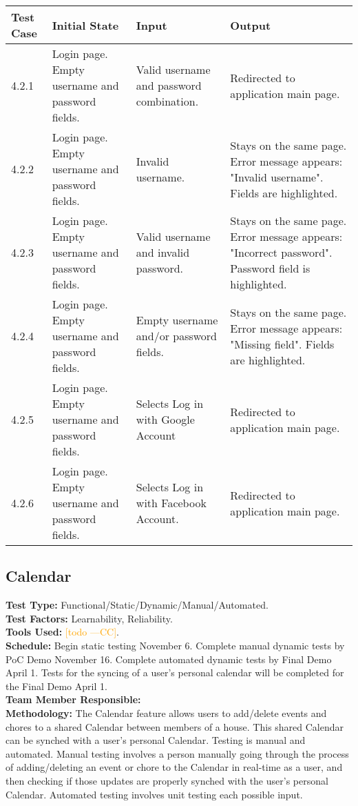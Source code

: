 \documentclass[12pt]{article}
\newcommand{\authornote}[3]{\textcolor{#1}{[#3 ---#2]}}
\newcommand{\authornote}[3]{}
\newcommand{\cc}[1]{\authornote{orange}{CC}{#1}}
\begin{document}
\begin{longtable}{|p{2cm}|p{3cm}|p{5cm}|p{5cm}|}
\hline
\textbf{Test Case}  & \textbf{Initial State} & \textbf{Input} & \textbf{Output} \\ \hline
4.2.1 & Login page. Empty username and password fields. & Valid username and password combination. & Redirected to application main page. \\ 
\hline
4.2.2 & Login page. Empty username and password fields. & Invalid username. & Stays on the same page. Error message appears: "Invalid username". Fields are highlighted. \\
\hline
4.2.3 & Login page. Empty username and password fields. & Valid username and invalid password. & Stays on the same page. Error message appears: "Incorrect password". Password field is highlighted. \\
\hline
4.2.4 & Login page. Empty username and password fields. & Empty username and/or password fields. & Stays on the same page. Error message appears: "Missing field". Fields are highlighted. \\
\hline
4.2.5 & Login page. Empty username and password fields. & Selects Log in with Google Account & Redirected to application main page. \\ 
\hline
4.2.6 & Login page. Empty username and password fields. & Selects Log in with Facebook Account. & Redirected to application main page. \\ 
\hline
\end{longtable}



\subsection{Calendar}
\textbf{Test Type:} Functional/Static/Dynamic/Manual/Automated. \\
\textbf{Test Factors:} Learnability, Reliability. \\
\textbf{Tools Used:} \cc{todo}. \\
\textbf{Schedule:} Begin static testing November 6. Complete manual dynamic tests by PoC Demo November 16. Complete automated dynamic tests by Final Demo April 1. Tests for the syncing of a user's personal calendar will be completed for the Final Demo April 1. \\
\textbf{Team Member Responsible:} \\
\textbf{Methodology:} The Calendar feature allows users to add/delete events and chores to a shared Calendar between members of a house. This shared Calendar can be synched with a user's personal Calendar. Testing is manual and automated. Manual testing involves a person manually going through the process of adding/deleting an event or chore to the Calendar in real-time as a user, and then checking if those updates are properly synched with the user's personal Calendar. Automated testing involves unit testing each possible input.
\end{document}
